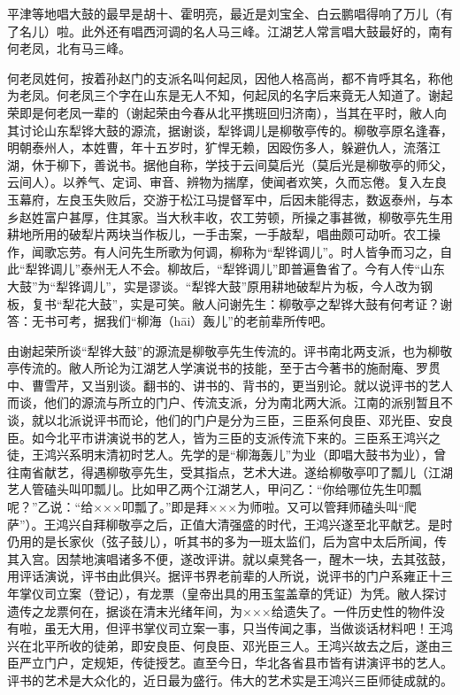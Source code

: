 \documentclass[12pt,UTF8]{ctexbook}
\begin{document}
平津等地唱大鼓的最早是胡十、霍明亮，最近是刘宝全、白云鹏唱得响了万儿（有了名儿）啦。此外还有唱西河调的名人马三峰。江湖艺人常言唱大鼓最好的，南有何老凤，北有马三峰。

何老凤姓何，按着孙赵门的支派名叫何起凤，因他人格高尚，都不肯呼其名，称他为老凤。何老凤三个字在山东是无人不知，何起凤的名字后来竟无人知道了。谢起荣即是何老凤一辈的（谢起荣由今春从北平携班回归济南），当其在平时，敝人向其讨论山东犁铧大鼓的源流，据谢谈，犁铧调儿是柳敬亭传的。柳敬亭原名逢春，明朝泰州人，本姓曹，年十五岁时，犷悍无赖，因殴伤多人，躲避仇人，流落江湖，休于柳下，善说书。据他自称，学技于云间莫后光（莫后光是柳敬亭的师父，云间人）。以养气、定词、审音、辨物为揣摩，使闻者欢笑，久而忘倦。复入左良玉幕府，左良玉失败后，交游于松江马提督军中，后因未能得志，数返泰州，与本乡赵姓富户甚厚，住其家。当大秋丰收，农工劳顿，所操之事甚微，柳敬亭先生用耕地所用的破犁片两块当作板儿，一手击案，一手敲犁，唱曲颇可动听。农工操作，闻歌忘劳。有人问先生所歌为何调，柳称为“犁铧调儿”。时人皆争而习之，自此“犁铧调儿”泰州无人不会。柳故后，“犁铧调儿”即普遍鲁省了。今有人传“山东大鼓”为“犁铧调儿”，实是谬谈。“犁铧大鼓”原用耕地破犁片为板，今人改为钢板，复书“犁花大鼓”，实是可笑。敝人问谢先生：柳敬亭之犁铧大鼓有何考证？谢答：无书可考，据我们“柳海（hāi）轰儿”的老前辈所传吧。

由谢起荣所谈“犁铧大鼓”的源流是柳敬亭先生传流的。评书南北两支派，也为柳敬亭传流的。敝人所论为江湖艺人学演说书的技能，至于古今著书的施耐庵、罗贯中、曹雪芹，又当别谈。翻书的、讲书的、背书的，更当别论。就以说评书的艺人而谈，他们的源流与所立的门户、传流支派，分为南北两大派。江南的派别暂且不谈，就以北派说评书而论，他们的门户是分为三臣，三臣系何良臣、邓光臣、安良臣。如今北平市讲演说书的艺人，皆为三臣的支派传流下来的。三臣系王鸿兴之徒，王鸿兴系明末清初时艺人。先学的是“柳海轰儿”为业（即唱大鼓书为业），曾往南省献艺，得遇柳敬亭先生，受其指点，艺术大进。遂给柳敬亭叩了瓢儿（江湖艺人管磕头叫叩瓢儿。比如甲乙两个江湖艺人，甲问乙：“你给哪位先生叩瓢呢？”乙说：“给×××叩瓢了。”即是拜×××为师啦。又可以管拜师磕头叫“爬萨”）。王鸿兴自拜柳敬亭之后，正值大清强盛的时代，王鸿兴遂至北平献艺。是时仍用的是长家伙（弦子鼓儿），听其书的多为一班太监们，后为宫中太后所闻，传其入宫。因禁地演唱诸多不便，遂改评讲。就以桌凳各一，醒木一块，去其弦鼓，用评话演说，评书由此俱兴。据评书界老前辈的人所说，说评书的门户系雍正十三年掌仪司立案（登记），有龙票（皇帝出具的用玉玺盖章的凭证）为凭。敝人探讨遗传之龙票何在，据谈在清末光绪年间，为×××给遗失了。一件历史性的物件没有啦，虽无大用，但评书掌仪司立案一事，只当传闻之事，当做谈话材料吧！王鸿兴在北平所收的徒弟，即安良臣、何良臣、邓光臣三人。王鸿兴故去之后，遂由三臣严立门户，定规矩，传徒授艺。直至今日，华北各省县市皆有讲演评书的艺人。评书的艺术是大众化的，近日最为盛行。伟大的艺术实是王鸿兴三臣师徒成就的。
\end{document}
